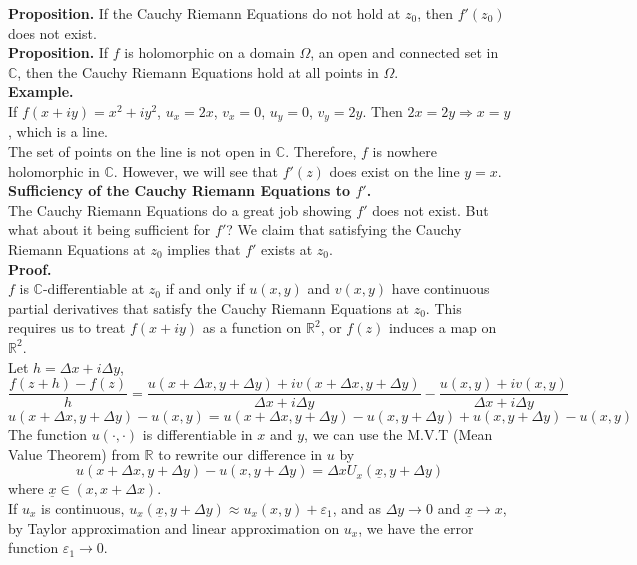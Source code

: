 \documentclass[11pt]{article}
\begin{document}
\textbf{Proposition.} If the Cauchy Riemann Equations do not hold at $z_0$, then $f'(z_0)$ does not exist. \\
\textbf{Proposition.} If $f$ is holomorphic on a domain $\Omega$, an open and connected set in $\mathbb{C}$, then the Cauchy Riemann Equations hold at all points in $\Omega$. \\
\newline
\textbf{Example.} \\
If $f(x + iy) = x^2 + iy^2$, $u_x = 2x$, $v_x = 0$, $u_y = 0$, $v_y = 2y$. Then $2x = 2y \Rightarrow x = y$, which is a line. \\
The set of points on the line is not open in $\mathbb{C}$. Therefore, $f$ is nowhere holomorphic in $\mathbb{C}$. However, we will see that $f'(z)$ does exist on the line $y = x$. \\
\newline
\textbf{Sufficiency of the Cauchy Riemann Equations to $f'$.} \\
The Cauchy Riemann Equations do a great job showing $f'$ does not exist. But what about it being sufficient for $f'$? We claim that satisfying the Cauchy Riemann Equations at $z_0$ implies that $f'$ exists at $z_0$. \\
\textbf{Proof.}\\
$f$ is $\mathbb{C}$-differentiable at $z_0$ if and only if $u(x, y)$ and $v(x, y)$ have continuous partial derivatives that satisfy the Cauchy Riemann Equations at $z_0$. 
This requires us to treat $f(x + iy)$ as a function on $\mathbb{R} ^ 2$, or $f(z)$ induces a map on $\mathbb{R} ^ 2$. \\
Let $ h = \Delta x + i\Delta y$, 
$$ \frac{f(z + h) - f(z)}{h} = \frac{u(x + \Delta x, y + \Delta y) + iv(x + \Delta x, y + \Delta y)}{\Delta x + i \Delta y} - \frac{u(x, y) + iv(x, y)}{\Delta x + i \Delta y}$$
$$u(x + \Delta x, y + \Delta y) - u(x, y) = u(x + \Delta x, y + \Delta y) - u(x, y + \Delta y) + u(x, y + \Delta y) - u(x, y)$$ 
The function $u(\cdot, \cdot)$ is differentiable in $x$ and $y$, we can use the M.V.T (Mean Value Theorem) from $\mathbb{R}$ to rewrite our difference in $u$ by \\
$$u(x + \Delta x, y + \Delta y) - u(x, y + \Delta y) = \Delta xU_x(\underline x, y + \Delta y)$$
where $\underline x \in (x, x + \Delta x)$. \\
\newline 
If $u_x$ is continuous, $u_x(\underline x, y + \Delta y) \approx u_x(x, y) + \varepsilon_1$, and as $\Delta y \to 0$ and $\underline x \to x$, by Taylor approximation and linear approximation on $u_x$, we have the error function $\varepsilon_1 \to 0$. \\
\end{document}
